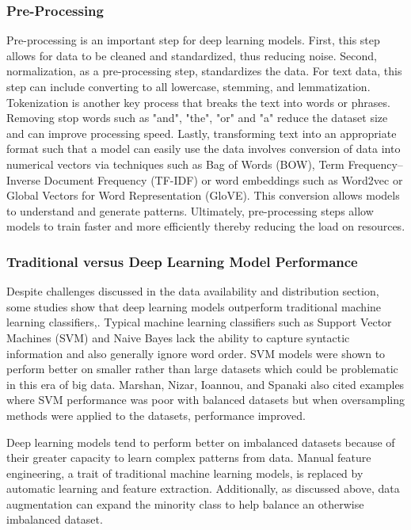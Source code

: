 \documentclass[conference]{IEEEtran}
\begin{document}
\subsubsection{Pre-Processing}
Pre-processing is an important step for deep learning models. First, this step allows for data to be cleaned and standardized, thus reducing noise. Second, normalization, as a pre-processing step, standardizes the data. For text data, this step can include converting to all lowercase, stemming, and lemmatization. Tokenization is another key process that breaks the text into words or phrases. Removing stop words such as "and", "the", "or" and "a" reduce the dataset size and can improve processing speed. Lastly, transforming text into an appropriate format such that a model can easily use the data involves conversion of data into numerical vectors via techniques such as Bag of Words (BOW), Term Frequency–Inverse Document Frequency (TF-IDF) or word embeddings such as Word2vec or Global Vectors for Word Representation (GloVE). This conversion allows models to understand and generate patterns. Ultimately, pre-processing steps allow models to train faster and more efficiently thereby reducing the load on resources\cite{b14}. 

\subsubsection{Traditional versus Deep Learning Model Performance}
Despite challenges discussed in the data availability and distribution section, some studies show that deep learning models outperform traditional machine learning classifiers\cite{b15},\cite{b16}. Typical machine learning classifiers such as Support Vector Machines (SVM) and Naive Bayes lack the ability to capture syntactic information and also generally ignore word order\cite{b11}. SVM models were shown to perform better on smaller rather than large datasets which could be problematic in this era of big data. Marshan, Nizar, Ioannou, and Spanaki also cited examples where SVM performance was poor with balanced datasets but when oversampling methods were applied to the datasets, performance improved\cite{b12}.

Deep learning models tend to perform better on imbalanced datasets because of their greater capacity to learn complex patterns from data. Manual feature engineering, a trait of traditional machine learning models, is replaced by automatic learning and feature extraction. Additionally, as discussed above, data augmentation can expand the minority class to help balance an otherwise imbalanced dataset\cite{b11}. 
\end{document}
